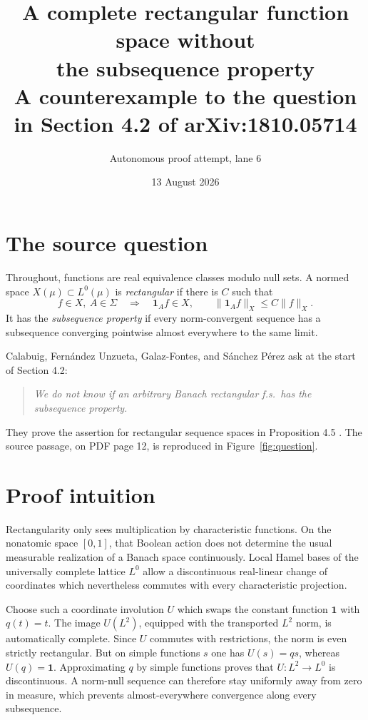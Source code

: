 \documentclass[11pt]{article}
\title{A complete rectangular function space without\\
the subsequence property\\
\large A counterexample to the question in Section 4.2 of arXiv:1810.05714}
\author{Autonomous proof attempt, lane 6}
\date{13 August 2026}
\newcommand{\one}{\mathbf 1}
\begin{document}
\maketitle

\begin{center}
\end{center}

\section{The source question}

Throughout, functions are real equivalence classes modulo null sets.  A normed
space $X(\mu)\subset L^0(\mu)$ is \emph{rectangular} if there is $C$ such that
\[
 f\in X,\ A\in\Sigma
 \quad\Longrightarrow\quad
 \one_Af\in X,\qquad \|\one_Af\|_X\le C\|f\|_X.
\]
It has the \emph{subsequence property} if every norm-convergent sequence has a
subsequence converging pointwise almost everywhere to the same limit.

Calabuig, Fern\'andez Unzueta, Galaz-Fontes, and S\'anchez P\'erez ask at the
start of Section 4.2:
\begin{quote}
\emph{We do not know if an arbitrary Banach rectangular f.s.\ has the
subsequence property.}
\end{quote}
They prove the assertion for rectangular sequence spaces in Proposition 4.5
\cite[Section 4.2]{CFGS}.  The source passage, on PDF page 12, is reproduced in
Figure~\ref{fig:question}.

\section{Proof intuition}

Rectangularity only sees multiplication by characteristic functions.  On the
nonatomic space $[0,1]$, that Boolean action does not determine the usual
measurable realization of a Banach space continuously.  Local Hamel bases of
the universally complete lattice $L^0$ allow a discontinuous real-linear
change of coordinates which nevertheless commutes with every characteristic
projection.

Choose such a coordinate involution $U$ which swaps the constant function
$\one$ with $q(t)=t$.  The image $U(L^2)$, equipped with the transported
$L^2$ norm, is automatically complete.  Since $U$ commutes with restrictions,
the norm is even strictly rectangular.  But on simple functions $s$ one has
$U(s)=qs$, whereas $U(q)=\one$.  Approximating $q$ by simple functions proves
that $U:L^2\to L^0$ is discontinuous.  A norm-null sequence can therefore stay
uniformly away from zero in measure, which prevents almost-everywhere
convergence along every subsequence.
\end{document}
